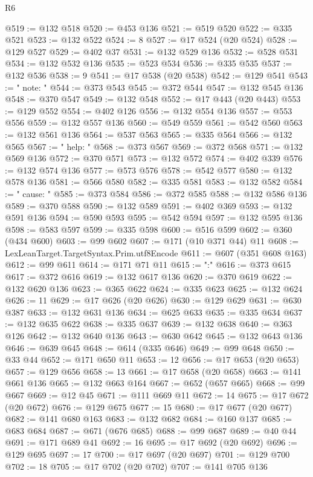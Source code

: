 \begin{lexlean}{R6}
\begin{coremodule}
@519 := @132 @518
@520 := @453 @136
@521 := @519 @520
@522 := @335 @521
@523 := @132 @522
@524 := 8
@527 := @17 @524 (@20 @524)
@528 := @129 @527
@529 := @402 @37
@531 := @132 @529 @136
@532 := @528 @531
@534 := @132 @532 @136
@535 := @523 @534
@536 := @335 @535
@537 := @132 @536
@538 := 9
@541 := @17 @538 (@20 @538)
@542 := @129 @541
@543 := "  note: "
@544 := @373 @543
@545 := @372 @544
@547 := @132 @545 @136
@548 := @370 @547
@549 := @132 @548
@552 := @17 @443 (@20 @443)
@553 := @129 @552
@554 := @402 @126
@556 := @132 @554 @136
@557 := @553 @556
@559 := @132 @557 @136
@560 := @549 @559
@561 := @542 @560
@563 := @132 @561 @136
@564 := @537 @563
@565 := @335 @564
@566 := @132 @565
@567 := "  help: "
@568 := @373 @567
@569 := @372 @568
@571 := @132 @569 @136
@572 := @370 @571
@573 := @132 @572
@574 := @402 @339
@576 := @132 @574 @136
@577 := @573 @576
@578 := @542 @577
@580 := @132 @578 @136
@581 := @566 @580
@582 := @335 @581
@583 := @132 @582
@584 := "  cause: "
@585 := @373 @584
@586 := @372 @585
@588 := @132 @586 @136
@589 := @370 @588
@590 := @132 @589
@591 := @402 @369
@593 := @132 @591 @136
@594 := @590 @593
@595 := @542 @594
@597 := @132 @595 @136
@598 := @583 @597
@599 := @335 @598
@600 := @516 @599
@602 := @360 (@434 @600)
@603 := @99 @602
@607 := @171 (@10 @371 @44) @11
@608 := LexLeanTarget.TargetSyntax.Prim.utf8Encode
@611 := @607 (@351 @608 @163)
@612 := @99 @611
@614 := @171 @71 @11
@615 := ":"
@616 := @373 @615
@617 := @372 @616
@619 := @132 @617 @136
@620 := @370 @619
@622 := @132 @620 @136
@623 := @365 @622
@624 := @335 @623
@625 := @132 @624
@626 := 11
@629 := @17 @626 (@20 @626)
@630 := @129 @629
@631 := @630 @387
@633 := @132 @631 @136
@634 := @625 @633
@635 := @335 @634
@637 := @132 @635 @622
@638 := @335 @637
@639 := @132 @638
@640 := @363 @126
@642 := @132 @640 @136
@643 := @630 @642
@645 := @132 @643 @136
@646 := @639 @645
@648 := @614 (@335 @646)
@649 := @99 @648
@650 := @33 @44
@652 := @171 @650 @11
@653 := 12
@656 := @17 @653 (@20 @653)
@657 := @129 @656
@658 := 13
@661 := @17 @658 (@20 @658)
@663 := @141 @661 @136
@665 := @132 @663 @164
@667 := @652 (@657 @665)
@668 := @99 @667
@669 := @12 @45
@671 := @111 @669 @11
@672 := 14
@675 := @17 @672 (@20 @672)
@676 := @129 @675
@677 := 15
@680 := @17 @677 (@20 @677)
@682 := @141 @680 @163
@683 := @132 @682
@684 := @160 @137
@685 := @683 @684
@687 := @671 (@676 @685)
@688 := @99 @687
@689 := @40 @44
@691 := @171 @689 @41
@692 := 16
@695 := @17 @692 (@20 @692)
@696 := @129 @695
@697 := 17
@700 := @17 @697 (@20 @697)
@701 := @129 @700
@702 := 18
@705 := @17 @702 (@20 @702)
@707 := @141 @705 @136

\end{coremodule}
\end{lexlean}
